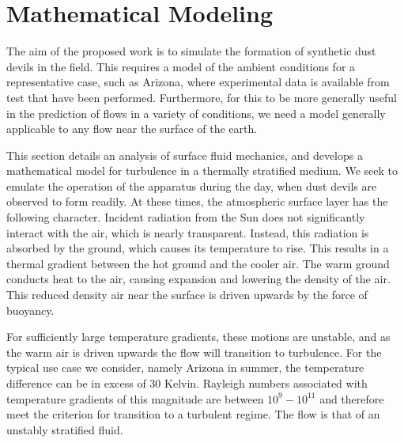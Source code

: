 \section{Mathematical Modeling}
\label{sec:mathmodel}


%
%

The aim of the proposed work is to simulate the formation of synthetic
dust devils in the field. This requires a model of the ambient
conditions for a representative case, such as Arizona, where
experimental data is available from test that have been
performed. Furthermore, for this to be more generally useful in the
prediction of flows in a variety of conditions, we need a model generally
applicable to any flow near the surface of the earth.  

This section details an analysis of surface fluid mechanics, and
develops a mathematical model for turbulence in a thermally stratified
medium. We seek to emulate the operation of the apparatus during the
day, when dust devils are observed to form readily. 
At these times, the atmospheric surface layer has the following
character. Incident radiation from the Sun does not significantly
interact with the air, which is nearly transparent. Instead, this
radiation is absorbed by the ground, which causes its temperature to
rise. This results in a thermal gradient between the hot ground and the
cooler air. The warm ground conducts heat to the air, causing expansion
and lowering the density of the air. This reduced density air near the
surface is driven upwards by the force of buoyancy.  

For sufficiently large temperature gradients, these motions are
unstable, and as the warm air is driven upwards the flow will transition
to turbulence. For the typical use case we consider, namely Arizona in
summer, the temperature difference can be in excess of 30 Kelvin. 
Rayleigh numbers associated with temperature gradients of this magnitude
are between $10^{9} - 10^{11}$ and therefore meet the criterion
for transition to a turbulent regime. The flow is that of an unstably
stratified fluid.  

